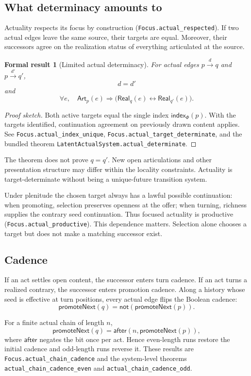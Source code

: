 \documentclass[11pt]{article}
\newtheorem{formalresult}{Formal result}[section]
\theoremstyle{definition}
\theoremstyle{remark}
\newcommand{\lean}[1]{\nolinkurl{#1}}
\newcommand{\Art}{\mathsf{Art}}
\newcommand{\Real}{\mathsf{Real}}
\newcommand{\Prom}{\mathsf{promoteNext}}
\newcommand{\Index}{\mathsf{index}}
\newcommand{\After}{\mathsf{after}}
\begin{document}
\subsection{What determinacy amounts to}

Actuality respects its focus by construction
(\lean{Focus.actual_respected}). If two actual edges leave the same source,
their targets are equal. Moreover, their successors agree on the realization
status of everything articulated at the source.

\begin{formalresult}[Limited actual determinacy]
For actual edges \(p\xrightarrow{d}q\) and
\(p\xrightarrow{d'}q'\),
\[
  d=d'
\]
and
\[
  \forall e,\quad \Art_p(e)\Rightarrow
  \bigl(\Real_q(e)\leftrightarrow\Real_{q'}(e)\bigr).
\]
\end{formalresult}

\begin{proof}[Proof sketch]
Both active targets equal the single index \(\Index_\Phi(p)\). With the targets
identified, continuation agreement on previously drawn content applies. See
\lean{Focus.actual_index_unique},
\lean{Focus.actual_target_determinate}, and the bundled theorem
\lean{LatentActualSystem.actual_determinate}.
\end{proof}

The theorem does not prove \(q=q'\). New open articulations and other
presentation structure may differ within the locality constraints. Actuality
is target-determinate without being a unique-future transition system.

Under plenitude the chosen target always has a lawful possible continuation:
when promoting, selection preserves openness at the offer; when turning,
richness supplies the contrary seed continuation. Thus focused actuality is
productive (\lean{Focus.actual_productive}). This dependence matters.
Selection alone chooses a target but does not make a matching successor exist.

\subsection{Cadence}

If an act settles open content, the successor enters turn cadence. If an act
turns a realized contrary, the successor enters promotion cadence. Along a
history whose seed is effective at turn positions, every actual edge flips the
Boolean cadence:
\[
  \Prom(q)=\mathsf{not}(\Prom(p)).
\]

For a finite actual chain of length \(n\),
\[
  \Prom(q)=\After(n,\Prom(p)),
\]
where \(\After\) negates the bit once per act. Hence even-length runs restore
the initial cadence and odd-length runs reverse it. These results are
\lean{Focus.actual_chain_cadence} and the system-level theorems
\lean{actual_chain_cadence_even} and \lean{actual_chain_cadence_odd}.
\end{document}
